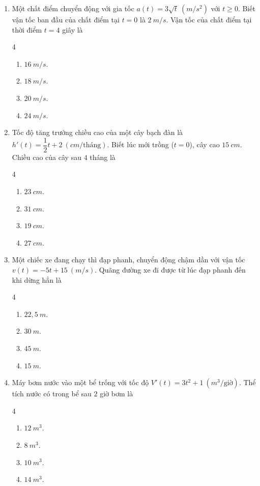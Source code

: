 \documentclass[12pt]{article}
\begin{document}
\begin{enumerate}[label=\textbf{Câu \arabic*.}]
		\item Một chất điểm chuyển động với gia tốc $a(t) = 3\sqrt{t} \ (m/s^2)$ với $t \ge 0$. Biết vận tốc ban đầu của chất điểm tại $t=0$ là $2 \ m/s$. Vận tốc của chất điểm tại thời điểm $t = 4$ giây là
		\begin{multicols}{4}
			\begin{enumerate}[label=\textbf{\Alph*.}]
				\item $16 \ m/s$.
				\item $18 \ m/s$.
				\item $20 \ m/s$.
				\item $24 \ m/s$.
			\end{enumerate}
		\end{multicols}
		
		\item Tốc độ tăng trưởng chiều cao của một cây bạch đàn là $h'(t) = \dfrac{1}{2}t + 2 \ (cm/\text{tháng})$. Biết lúc mới trồng ($t = 0$), cây cao $15 \ cm$. Chiều cao của cây sau $4$ tháng là
		\begin{multicols}{4}
			\begin{enumerate}[label=\textbf{\Alph*.}]
				\item $23 \ cm$.
				\item $31 \ cm$.
				\item $19 \ cm$.
				\item $27 \ cm$.
			\end{enumerate}
		\end{multicols}
		
		\item Một chiếc xe đang chạy thì đạp phanh, chuyển động chậm dần với vận tốc $v(t) = -5t + 15 \ (m/s)$. Quãng đường xe đi được từ lúc đạp phanh đến khi dừng hẳn là
		\begin{multicols}{4}
			\begin{enumerate}[label=\textbf{\Alph*.}]
				\item $22,5 \ m$.
				\item $30 \ m$.
				\item $45 \ m$.
				\item $15 \ m$.
			\end{enumerate}
		\end{multicols}
		
		\item Máy bơm nước vào một bể trống với tốc độ $V'(t) = 3t^2 + 1 \ (m^3/\text{giờ})$. Thể tích nước có trong bể sau $2$ giờ bơm là
		\begin{multicols}{4}
			\begin{enumerate}[label=\textbf{\Alph*.}]
				\item $12 \ m^3$.
				\item $8 \ m^3$.
				\item $10 \ m^3$.
				\item $14 \ m^3$.
			\end{enumerate}
		\end{multicols}
		

\end{enumerate}
\end{document}
